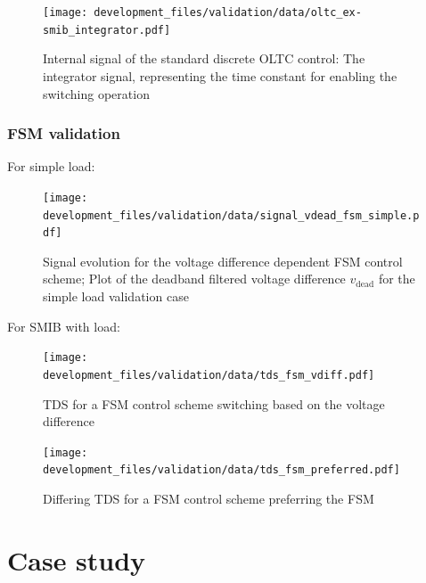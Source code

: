 \begin{figure}[H]
    \centering
    \texttt{[image: development\_files/validation/data/oltc\_ex-smib\_integrator.pdf]}
    \caption{Internal signal of the standard discrete \acs{OLTC} control: The integrator signal, representing the time constant for enabling the switching operation}
    \label{fig:int-signal-oltc-ext-smib-integrator}
\end{figure}

\subsection{FSM validation}

For simple load:
\begin{figure}[H]
    \centering
    \texttt{[image: development\_files/validation/data/signal\_vdead\_fsm\_simple.pdf]}
    \caption{Signal evolution for the voltage difference dependent \acs{FSM} control scheme; Plot of the deadband filtered voltage difference $v_\mathrm{dead}$ for the simple load validation case}
    \label{fig:signal-vdead-fsm-simple}
\end{figure}

For SMIB with load:

\begin{figure}[H]
    \centering
    \texttt{[image: development\_files/validation/data/tds\_fsm\_vdiff.pdf]}
    \caption[\acs{TDS} for a \acs{FSM} control scheme switching based on the voltage difference]{\acs{TDS} for a \acs{FSM} control scheme switching based on the voltage difference}
    \label{fig:tds-fsm-vdiff-ext-smib}
\end{figure}


\begin{figure}[H]
    \centering
    \texttt{[image: development\_files/validation/data/tds\_fsm\_preferred.pdf]}
    \caption[Differing \acs{TDS} for a \acs{FSM} control scheme preferring the \acs{FSM}]{Differing \acs{TDS} for a \acs{FSM} control scheme preferring the \acs{FSM}}
    \label{fig:tds-fsm-preferred}
\end{figure}

\chapter{Case study}